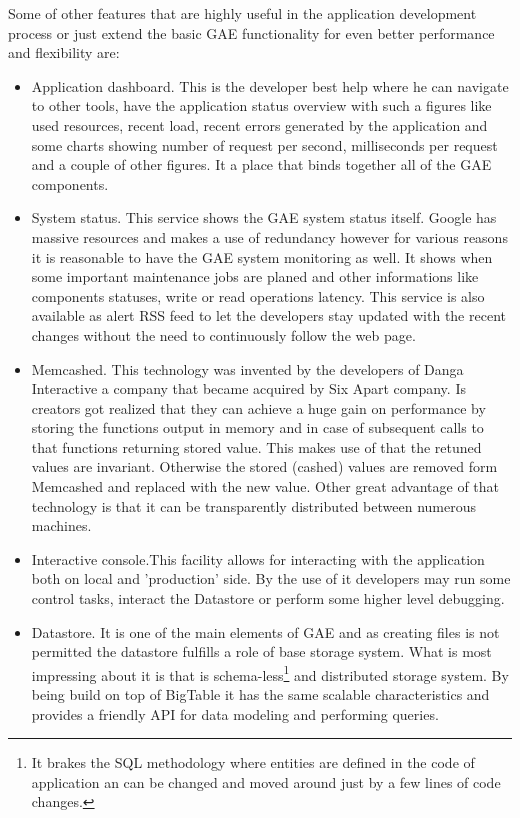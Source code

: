 Some of other features that are highly useful in the application development process or just extend the basic GAE functionality for even better performance and flexibility are:
\begin{itemize}
\item{Application dashboard. This is the developer best help where he can navigate to other tools, have the application status overview with such a figures like used resources, recent load, recent errors generated by the application and some charts showing number of request per second, milliseconds per request and a couple of other figures. It a place that binds together all of the GAE components.}
\item{System status. This service shows the GAE system status itself. Google has massive resources and makes a use of redundancy however for various reasons it is reasonable to have the GAE system monitoring as well. It shows when some important maintenance jobs are planed and other informations like components statuses, write or read operations latency. This service is also available as alert RSS feed to let the developers stay updated with the recent changes without the need to continuously follow the web page.}
\item{Memcashed. This technology was invented by the developers of Danga Interactive a company that became acquired by Six Apart company. Is creators got realized that they can achieve a huge gain on performance by storing the functions output in memory and in case of subsequent calls to that functions returning stored value. This makes use of that the retuned values are invariant. Otherwise the stored (cashed) values are removed form Memcashed and replaced with the new value. Other great advantage of that technology is that it can be transparently distributed between numerous machines.} 
\item{Interactive console.This facility allows for interacting with the application both on local and 'production' side. By the use of it developers may run some control tasks, interact the Datastore or perform some higher level debugging.}
\item{Datastore}. It is one of the main elements of GAE and as creating files is not permitted the datastore fulfills a role of base storage system. What is most impressing about it is that is schema-less\footnote{It brakes the SQL methodology where entities are defined in the code of application an can be changed and moved around just by a few lines of code changes.} and distributed storage system. By being build on top of BigTable it has the same scalable characteristics and provides a friendly API for data modeling and performing queries. 

\end{itemize}
